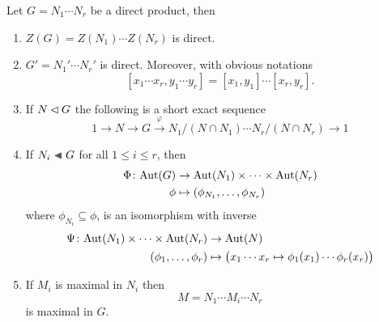 \begin{prop}\label{product-center-and-maximal}
    Let\/ $G=N_1\cdots N_r$ be a direct product, then
    \begin{enumerate}[\rm a)]
        \item  $Z(G)=Z(N_1)\cdots Z(N_r)$ is direct.
        \item $G'=N_1'\cdots N_r'$ is direct. Moreover, with obvious notations
        \begin{equation}\label{eq:commutator-distribution}
            [x_1\cdots x_r,y_1\cdots y_r]=[x_1,y_1]\cdots[x_r,y_r].
        \end{equation}
        \item If\/ $N\lhd G$ the following is a short exact sequence
        $$
            1\to N\to G\stackrel{\varphi}{\to} N_1/(N\cap N_1)\cdots N_r/(N\cap N_r)\to1
        $$
        \item If\/ $N_i\ch G$ for all\/ $1\le i\le r$, then
        \begin{align*}
            \Phi\colon{\rm Aut}(G) &\to {\rm Aut}(N_1)\times\cdots\times{\rm Aut}(N_r)\\
            \phi&\mapsto(\phi_{N_1},\dots,\phi_{N_r})
        \end{align*}
        where $\phi_{N_i}\subseteq\phi$, is an isomorphism with inverse
        \begin{align*}
            \Psi\colon{\rm Aut}(N_1)\times\cdots\times{\rm Aut}(N_r)&\to{\rm Aut}(N)\\
            (\phi_1,\dots,\phi_r)&\mapsto\big(x_1\cdots x_r\mapsto
                \phi_1(x_1)\cdots\phi_r(x_r)\big)
        \end{align*}
        \item If\/ $M_i$ is maximal in\/ $N_i$ then 
        $$
            M = N_1\cdots M_i\cdots N_r
        $$
        is maximal in\/ $G$.
    \end{enumerate}
\end{prop}

